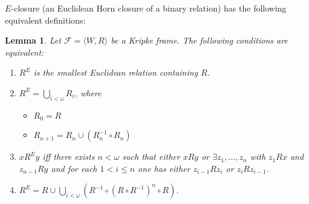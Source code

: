 \documentclass[a4paper]{article}
\theoremstyle{defin}
\theoremstyle{theorem}
\theoremstyle{prop}
\theoremstyle{lemma}
\newtheorem{lemma}{Lemma}
\theoremstyle{fact}
\theoremstyle{ex}
\theoremstyle{col}
\begin{document}
$E$-closure (an Euclidean Horn closure of a binary relation) has the following equivalent definitions:
\begin{lemma} \label{equivHorn}
  Let $\mathcal{F} = \langle W, R \rangle$ be a Kripke frame.
  The following conditions are equivalent:

  \begin{enumerate}
    \item $R^{E}$ is the smallest Euclidean relation containing $R$.
    \item $R^{E} = \bigcup \limits_{i < \omega} R_i$, where
    \begin{itemize}
      \item $R_0 = R$
      \item $R_{n + 1} = R_n \cup (R^{-1}_n \circ R_n)$
    \end{itemize}
    \item $x R^E y$ iff there exists $n < \omega$ such that
    either $x R y$ or $\exists z_1, \dots, z_n$ with $z_1 R x$ and $z_{n - 1} R y$ and for each $1 < i \leq n$ one has
    either $z_{i - 1} R z_i$ or $z_i R z_{i - 1}$.
    \item $R^{E} = R \cup \bigcup \limits_{i < \omega} (R^{-1} \circ (R \circ R^{-1})^n \circ R)$.
  \end{enumerate}
\end{lemma}
\end{document}
